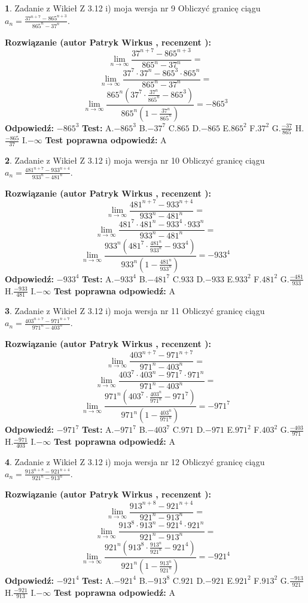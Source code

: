 \documentclass[12pt, a4paper]{article}
\theoremstyle{definition} %
\newtheorem{zad}{}
\newcommand{\zadStart}[1]{\begin{zad}#1\newline}
\newcommand{\zadStop}{\end{zad}}
\newcommand{\rozwStart}[2]{\noindent \textbf{Rozwiązanie (autor #1 , recenzent #2): }\newline}
\newcommand{\rozwStop}{\newline}
\newcommand{\odpStart}{\noindent \textbf{Odpowiedź:}\newline}
\newcommand{\odpStop}{\newline}
\newcommand{\testStart}{\noindent \textbf{Test:}\newline}
\newcommand{\testStop}{\newline}
\newcommand{\kluczStart}{\noindent \textbf{Test poprawna odpowiedź:}\newline}
\newcommand{\kluczStop}{\newline}
\begin{document}
\zadStart{Zadanie z Wikieł Z 3.12 i) moja wersja nr 9}
Obliczyć granicę ciągu $a_{n}=\frac{37^{n+7} - 865^{n+3}}{865^{n}-37^{n}}$.
\zadStop
\rozwStart{Patryk Wirkus}{}
$$\lim\limits_{n\to\infty}\frac{37^{n+7} - 865^{n+3}}{865^{n}-37^{n}}=$$
$$\lim\limits_{n\to\infty}\frac{37^{7} \cdot 37^{n} - 865^{3} \cdot 865^{n}}{865^{n}-37^{n}}=$$
$$\lim\limits_{n\to\infty}\frac{865^{n}(37^{7} \cdot \frac{37^{n}}{865^{n}} - 865^{3})}{865^{n}(1-\frac{37^{n}}{865^{n}})} = -865^{3}$$
\rozwStop
\odpStart
$-865^{3}$
\odpStop
\testStart
A.$-865^{3}$
B.$-37^{7}$
C.$865$
D.$-865$
E.$865^{2}$
F.$37^{2}$
G.$\frac{-37}{865}$
H.$\frac{-865}{37}$
I.$-\infty$
\testStop
\kluczStart
A
\kluczStop



\zadStart{Zadanie z Wikieł Z 3.12 i) moja wersja nr 10}
Obliczyć granicę ciągu $a_{n}=\frac{481^{n+7} - 933^{n+4}}{933^{n}-481^{n}}$.
\zadStop
\rozwStart{Patryk Wirkus}{}
$$\lim\limits_{n\to\infty}\frac{481^{n+7} - 933^{n+4}}{933^{n}-481^{n}}=$$
$$\lim\limits_{n\to\infty}\frac{481^{7} \cdot 481^{n} - 933^{4} \cdot 933^{n}}{933^{n}-481^{n}}=$$
$$\lim\limits_{n\to\infty}\frac{933^{n}(481^{7} \cdot \frac{481^{n}}{933^{n}} - 933^{4})}{933^{n}(1-\frac{481^{n}}{933^{n}})} = -933^{4}$$
\rozwStop
\odpStart
$-933^{4}$
\odpStop
\testStart
A.$-933^{4}$
B.$-481^{7}$
C.$933$
D.$-933$
E.$933^{2}$
F.$481^{2}$
G.$\frac{-481}{933}$
H.$\frac{-933}{481}$
I.$-\infty$
\testStop
\kluczStart
A
\kluczStop



\zadStart{Zadanie z Wikieł Z 3.12 i) moja wersja nr 11}
Obliczyć granicę ciągu $a_{n}=\frac{403^{n+7} - 971^{n+7}}{971^{n}-403^{n}}$.
\zadStop
\rozwStart{Patryk Wirkus}{}
$$\lim\limits_{n\to\infty}\frac{403^{n+7} - 971^{n+7}}{971^{n}-403^{n}}=$$
$$\lim\limits_{n\to\infty}\frac{403^{7} \cdot 403^{n} - 971^{7} \cdot 971^{n}}{971^{n}-403^{n}}=$$
$$\lim\limits_{n\to\infty}\frac{971^{n}(403^{7} \cdot \frac{403^{n}}{971^{n}} - 971^{7})}{971^{n}(1-\frac{403^{n}}{971^{n}})} = -971^{7}$$
\rozwStop
\odpStart
$-971^{7}$
\odpStop
\testStart
A.$-971^{7}$
B.$-403^{7}$
C.$971$
D.$-971$
E.$971^{2}$
F.$403^{2}$
G.$\frac{-403}{971}$
H.$\frac{-971}{403}$
I.$-\infty$
\testStop
\kluczStart
A
\kluczStop



\zadStart{Zadanie z Wikieł Z 3.12 i) moja wersja nr 12}
Obliczyć granicę ciągu $a_{n}=\frac{913^{n+8} - 921^{n+4}}{921^{n}-913^{n}}$.
\zadStop
\rozwStart{Patryk Wirkus}{}
$$\lim\limits_{n\to\infty}\frac{913^{n+8} - 921^{n+4}}{921^{n}-913^{n}}=$$
$$\lim\limits_{n\to\infty}\frac{913^{8} \cdot 913^{n} - 921^{4} \cdot 921^{n}}{921^{n}-913^{n}}=$$
$$\lim\limits_{n\to\infty}\frac{921^{n}(913^{8} \cdot \frac{913^{n}}{921^{n}} - 921^{4})}{921^{n}(1-\frac{913^{n}}{921^{n}})} = -921^{4}$$
\rozwStop
\odpStart
$-921^{4}$
\odpStop
\testStart
A.$-921^{4}$
B.$-913^{8}$
C.$921$
D.$-921$
E.$921^{2}$
F.$913^{2}$
G.$\frac{-913}{921}$
H.$\frac{-921}{913}$
I.$-\infty$
\testStop
\kluczStart
A
\kluczStop
\end{document}
